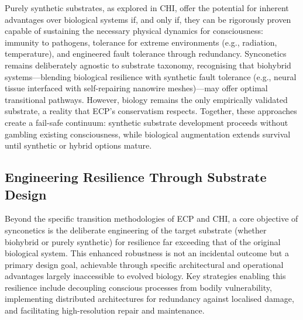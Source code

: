 \documentclass[10pt]{article}
\begin{document}
\begin{sloppypar}
  Purely synthetic substrates, as explored in CHI, offer the potential for inherent advantages over biological systems if, and only if, they can be rigorously proven capable of sustaining the necessary physical dynamics for consciousness: immunity to pathogens, tolerance for extreme environments (e.g., radiation, temperature), and engineered fault tolerance through redundancy. Synconetics remains deliberately agnostic to substrate taxonomy, recognising that biohybrid systems—blending biological resilience with synthetic fault tolerance (e.g., neural tissue interfaced with self-repairing nanowire meshes)—may offer optimal transitional pathways. However, biology remains the only empirically validated substrate, a reality that ECP’s conservatism respects. Together, these approaches create a fail-safe continuum: synthetic substrate development proceeds without gambling existing consciousness, while biological augmentation extends survival until synthetic or hybrid options mature.

  \subsection{Engineering Resilience Through Substrate Design}

  Beyond the specific transition methodologies of ECP and CHI, a core objective of synconetics is the deliberate engineering of the target substrate (whether biohybrid or purely synthetic) for resilience far exceeding that of the original biological system. This enhanced robustness is not an incidental outcome but a primary design goal, achievable through specific architectural and operational advantages largely inaccessible to evolved biology. Key strategies enabling this resilience include decoupling conscious processes from bodily vulnerability, implementing distributed architectures for redundancy against localised damage, and facilitating high-resolution repair and maintenance.


\end{sloppypar}
\end{document}
